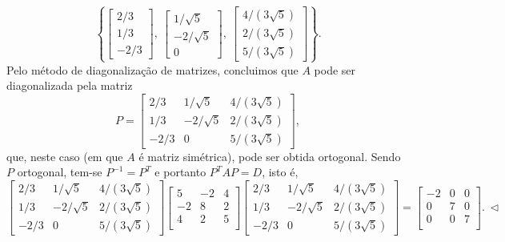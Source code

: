 \begin{ex}
	\begin{equation}
	\left\lbrace
	\begin{bmatrix}
	2/3 \\ 1/3 \\ -2/3
	\end{bmatrix}, \
	\begin{bmatrix}
	1/\sqrt{5} \\ -2/\sqrt{5} \\ 0
	\end{bmatrix}, \
	\begin{bmatrix}
	4/(3\sqrt{5}) \\ 2/(3\sqrt{5}) \\ 5/(3\sqrt{5})
	\end{bmatrix}
	\right\rbrace.
	\end{equation} Pelo método de diagonalização de matrizes, concluimos que $A$ pode ser diagonalizada pela matriz
	\begin{equation}
	P =
	\begin{bmatrix}
	2/3  & 1/\sqrt{5}  & 4/(3\sqrt{5}) \\
	1/3  & -2/\sqrt{5} & 2/(3\sqrt{5}) \\
	-2/3 &       0     & 5/(3\sqrt{5})
	\end{bmatrix},
	\end{equation} que, neste caso (em que $A$ é matriz simétrica), pode ser obtida ortogonal. Sendo $P$ ortogonal, tem-se $P^{-1} = P^T$ e portanto $P^{T} A P =  D$, isto é,
	\begin{equation}
	\begin{bmatrix}
	2/3  & 1/\sqrt{5}  & 4/(3\sqrt{5}) \\
	1/3  & -2/\sqrt{5} & 2/(3\sqrt{5}) \\
	-2/3 &       0     & 5/(3\sqrt{5})
	\end{bmatrix}
	\begin{bmatrix}
	5 & -2 & 4 \\
	-2 & 8 & 2 \\
	4 & 2 & 5 \\
	\end{bmatrix}
	\begin{bmatrix}
	2/3  & 1/\sqrt{5}  & 4/(3\sqrt{5}) \\
	1/3  & -2/\sqrt{5} & 2/(3\sqrt{5}) \\
	-2/3 &       0     & 5/(3\sqrt{5})
	\end{bmatrix} =
	\begin{bmatrix}
	-2& 0 & 0 \\
	0 & 7 & 0 \\
	0 & 0 & 7 \\
	\end{bmatrix}. \ \lhd
	\end{equation}
\end{ex}


